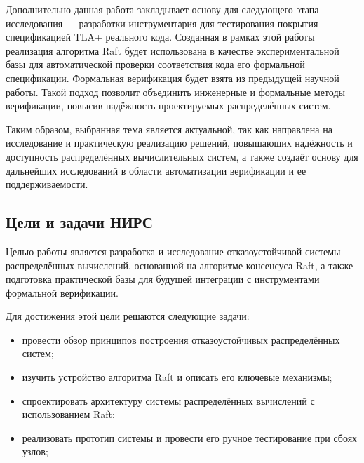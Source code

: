 Дополнительно данная работа закладывает основу для следующего этапа
исследования — разработки инструментария для тестирования покрытия спецификацией
TLA+ реального кода. Созданная в рамках этой работы реализация алгоритма Raft
будет использована в качестве экспериментальной базы для автоматической
проверки соответствия кода его формальной спецификации. Формальная верификация
будет взята из предыдущей научной работы. Такой подход позволит объединить
инженерные и формальные методы верификации, повысив надёжность проектируемых
распределённых систем.

Таким образом, выбранная тема является актуальной, так как направлена на
исследование и практическую реализацию решений, повышающих надёжность и
доступность распределённых вычислительных систем, а также создаёт основу для
дальнейших исследований в области автоматизации верификации и ее
поддерживаемости.

\subsection*{Цели и задачи НИРС}

Целью работы является разработка и исследование отказоустойчивой системы
распределённых вычислений, основанной на алгоритме консенсуса Raft, а также
подготовка практической базы для будущей интеграции с инструментами формальной
верификации.

Для достижения этой цели решаются следующие задачи:

\begin{itemize}
    \item провести обзор принципов построения отказоустойчивых распределённых
          систем;
    \item изучить устройство алгоритма Raft и описать его ключевые механизмы;
    \item спроектировать архитектуру системы распределённых вычислений с
          использованием Raft;
    \item реализовать прототип системы и провести его ручное тестирование при
          сбоях узлов;
\end{itemize}

